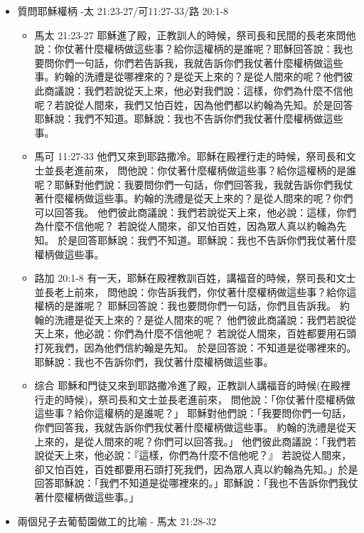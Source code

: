 \begin{itemize}
\item 質問耶穌權柄 -太 21:23-27/可11:27-33/路 20:1-8
\begin{itemize}
\item{馬太 21:23-27}
耶穌進了殿，正教訓人的時候，祭司長和民間的長老來問他說：你仗著什麼權柄做這些事？給你這權柄的是誰呢？耶穌回答說：我也要問你們一句話，你們若告訴我，我就告訴你們我仗著什麼權柄做這些事。約翰的洗禮是從哪裡來的？是從天上來的？是從人間來的呢？他們彼此商議說：我們若說從天上來，他必對我們說：這樣，你們為什麼不信他呢？若說從人間來，我們又怕百姓，因為他們都以約翰為先知。於是回答耶穌說：我們不知道。耶穌說：我也不告訴你們我仗著什麼權柄做這些事。
\item{馬可 11:27-33 }
他們又來到耶路撒冷。耶穌在殿裡行走的時候，祭司長和文士並長老進前來，
問他說：你仗著什麼權柄做這些事？給你這權柄的是誰呢？耶穌對他們說：我要問你們一句話，你們回答我，我就告訴你們我仗著什麼權柄做這些事。約翰的洗禮是從天上來的？是從人間來的呢？你們可以回答我。
他們彼此商議說：我們若說從天上來，他必說：這樣，你們為什麼不信他呢？
若說從人間來，卻又怕百姓，因為眾人真以約翰為先知。
於是回答耶穌說：我們不知道。耶穌說：我也不告訴你們我仗著什麼權柄做這些事。
\item{路加 20:1-8}
有一天，耶穌在殿裡教訓百姓，講福音的時候，祭司長和文士並長老上前來，
問他說：你告訴我們，你仗著什麼權柄做這些事？給你這權柄的是誰呢？
耶穌回答說：我也要問你們一句話，你們且告訴我。
約翰的洗禮是從天上來的？是從人間來的呢？
他們彼此商議說：我們若說從天上來，他必說：你們為什麼不信他呢？
若說從人間來，百姓都要用石頭打死我們，因為他們信約翰是先知。
於是回答說：不知道是從哪裡來的。
耶穌說：我也不告訴你們，我仗著什麼權柄做這些事。
\item{综合}
耶穌和門徒又來到耶路撒冷進了殿，正教訓人講福音的時候(在殿裡行走的時候)，祭司長和文士並長老進前來， 問他說：「你仗著什麼權柄做這些事？給你這權柄的是誰呢？」 耶穌對他們說：「我要問你們一句話，你們回答我，我就告訴你們我仗著什麼權柄做這些事。 約翰的洗禮是從天上來的，是從人間來的呢？你們可以回答我。」 他們彼此商議說：「我們若說從天上來，他必說：『這樣，你們為什麼不信他呢？』 若說從人間來，卻又怕百姓，百姓都要用石頭打死我們，因為眾人真以約翰為先知。」於是回答耶穌說：「我們不知道是從哪裡來的。」耶穌說：「我也不告訴你們我仗著什麼權柄做這些事。」
\end{itemize}
\item{兩個兒子去葡萄園做工的比喻 - 馬太 21:28-32}\\

\end{itemize}
